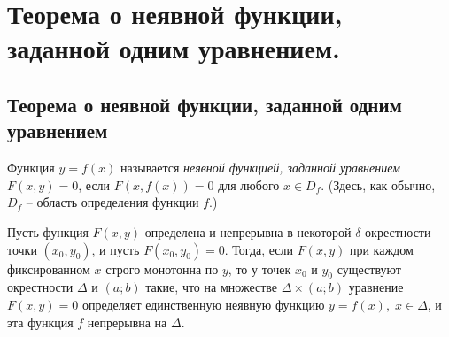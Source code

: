 \chapter{Теорема о неявной функции, заданной одним уравнением.}
\section{Теорема о неявной функции, заданной одним уравнением}
\begin{defn}
Функция $y=f(x)$ называется \textit{неявной функцией, заданной уравнением} $F(x,y)=0$, если $F(x,f(x))=0$ для любого $x\in D_f$. (Здесь, как обычно, $D_f$ -- область определения функции $f$.)
\end{defn}

\begin{thm}\label{yaa14th1}
Пусть функция $F(x,y)$ определена и непрерывна в некоторой $\delta$-окрестности точки $(x_0,y_0)$, и пусть $F(x_0,y_0)=0$. Тогда, если $F(x,y)$ при каждом фиксированном $x$ строго монотонна по $y$, то у точек $x_0$ и $y_0$ существуют окрестности $\Delta$ и $(a;b)$ такие, что на множестве $\Delta\times(a;b)$ уравнение $F(x,y)=0$ определяет единственную неявную функцию $y=f(x),\; x\in\Delta$, и эта функция  $f$ непрерывна на $\Delta$. 
\end{thm}

